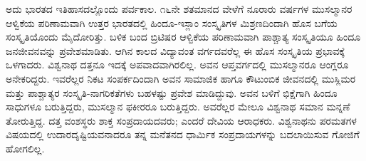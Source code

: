 ಅದು ಭಾರತದ ಇತಿಹಾಸದಲ್ಲೊಂದು ಪರ್ವಕಾಲ. ೧೬ನೇ ಶತಮಾನದ ವೇಳೆಗೆ ನೂರಾರು ವರ್ಷಗಳ ಮುಸಲ್ಮಾನರ ಆಳ್ವಿಕೆಯ ಪರಿಣಾಮವಾಗಿ ಉತ್ತರ ಭಾರತದಲ್ಲಿ ಹಿಂದೂ-ಇಸ್ಲಾಂ ಸಂಸ್ಕೃತಿಗಳ ಮಿಶ್ರಣದಿಂದಾಗಿ ಹೊಸ ಬಗೆಯ ಸಂಸ್ಕೃತಿಯೊಂದು ಮೈದೋರಿತ್ತು. ಬಳಿಕ ಬಂದ ಬ್ರಿಟಿಷರ ಆಳ್ವಿಕೆಯ ಪರಿಣಾಮವಾಗಿ ಪಾಶ್ಚಾತ್ಯ ಸಂಸ್ಕೃತಿಯೂ ಹಿಂದೂ ಜನಜೀವನವನ್ನು ಪ್ರವೇಶಮಾಡಿತು. ಆಗಿನ ಕಾಲದ ವಿದ್ಯಾವಂತ ವರ್ಗದವರೆಲ್ಲ ಈ ಹೊಸ ಸಂಸ್ಕೃತಿಯ ಪ್ರಭಾವಕ್ಕೆ ಒಳಗಾದರು. ವಿಶ್ವನಾಥ ದತ್ತನೂ ಇದಕ್ಕೆ ಅಪವಾದವಾಗಿರಲಿಲ್ಲ. ಅವನ ಆಪ್ತವರ್ಗದಲ್ಲಿ ಮುಸಲ್ಮಾನರೂ ಆಂಗ್ಲರೂ ಅನೇಕರಿದ್ದರು. ಇವರೆಲ್ಲರ ನಿಕಟ ಸಂಪರ್ಕದಿಂದಾಗಿ ಅವನ ಸಾಮಾಜಿಕ ಹಾಗೂ ಕೌಟುಂಬಿಕ ಜೀವನದಲ್ಲಿ ಮುಸ್ಲಿಮರ ಮತ್ತು ಪಾಶ್ಚಾತ್ಯರ ಸಂಸ್ಕೃತಿ-ನಾಗರಿಕತೆಗಳು ಬಹಳಷ್ಟು ಪ್ರವೇಶ ಮಾಡಿದ್ದುವು. ಅವನ ಬಳಿಗೆ ಭಿಕ್ಷೆಗಾಗಿ ಹಿಂದೂ ಸಾಧುಗಳೂ ಬರುತ್ತಿದ್ದರು, ಮುಸಲ್ಮಾನ ಫಕೀರರೂ ಬರುತ್ತಿದ್ದರು. ಅವರೆಲ್ಲರ ಮೇಲೂ ವಿಶ್ವನಾಥ ಸಮಾನ ಮನ್ನಣೆ ತೋರುತ್ತಿದ್ದ. ದತ್ತ ವಂಶಸ್ಥರು ಶಾಕ್ತ ಸಂಪ್ರದಾಯದವರು; ಎಂದರೆ ದೇವಿಯ ಆರಾಧಕರು. ವಿಶ್ವನಾಥನು ಪರಮತಗಳ ವಿಷಯದಲ್ಲಿ ಉದಾರದೃಷ್ಟಿಯವನಾದರೂ ತನ್ನ ಮನೆತನದ ಧಾರ್ಮಿಕ ಸಂಪ್ರದಾಯಗಳನ್ನು ಬದಲಾಯಿಸುವ ಗೋಜಿಗೆ ಹೋಗಲಿಲ್ಲ.

